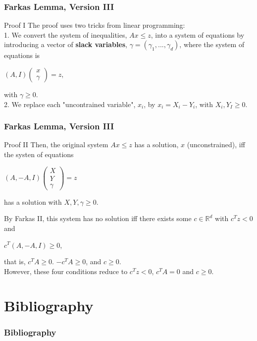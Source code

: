 \documentclass{beamer}
\begin{document}
\begin{frame}\frametitle{Farkas Lemma, Version III}
\begin{block}{Proof I}
The proof uses two tricks from linear programming: \\
1. We convert the system of inequalities, $A x \leq z$, into a system of equations by introducing a vector of \textbf{slack variables}, $γ = (γ_1, . . . , γ_d)$, where the system of equations is \\
\centerline{$(A, I)\begin{pmatrix}
x \\
\gamma
\end{pmatrix} = z$,}
with $\gamma \geq 0$. \\
2. We replace each "uncontrained variable", $x_i$, by $x_i = X_i - Y_i$, with $X_i, Y_I \geq 0$.
\end{block}
\end{frame}

\begin{frame}\frametitle{Farkas Lemma, Version III}
\begin{block}{Proof II}
Then, the original system $A x \leq z$ has a solution, $x$ (unconstrained), iff the systen of equations \\
\centerline{$(A, -A, I)\begin{pmatrix}
X \\
Y \\
\gamma
\end{pmatrix} = z$}
has a solution with $X, Y, \gamma \geq 0$.
\end{block}
\begin{block}{}
By Farkas II, this system has no solution iff there exists some $c \in \mathbb{R}^d$ with $c^T z < 0$ and \\
\centerline{$c^T (A, -A, I) \geq 0$,}
that is, $c^T A \geq 0$. $- c^T A \geq 0$, and $c \geq 0$. \\
However, these four conditions reduce to $c^T z < 0$, $c^T A = 0$ and $c \geq 0$.
\end{block}
\end{frame}

\section{Bibliography}
\begin{frame}[allowframebreaks]
\frametitle{Bibliography}
    \tiny{ }
    
\end{frame}
\end{document}
